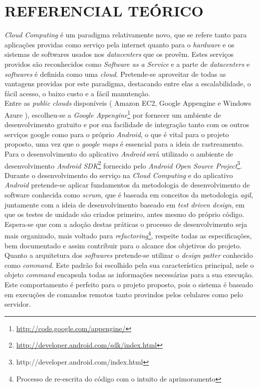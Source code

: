 \chapter{REFERENCIAL TEÓRICO}
\emph{Cloud Computing} é um paradigma relativamente novo, que se refere tanto para aplicações
providas como serviço pela internet quanto para o \emph{hardware} e os sistemas de softwares usados
nos \emph{datacenters} que os provêm. Estes serviços providos são reconhecidos como \emph{Software
as a Service} e a parte de \emph{datacenters} e \emph{softwares} é definida como uma  
\emph{cloud}\cite{clouds}. Pretende-se aproveitar de todas  as vantagens providas por este paradigma, destacando entre elas a
escalabilidade, o  fácil acesso, o baixo custo e a fácil manutenção.\\

Entre as \emph{public clouds} disponíveis ( Amazon EC2, Google Appengine e Windows Azure ),
escolheu-se a \emph{Google Appengine}\footnote{\url{http://code.google.com/appengine/}} por fornecer um ambiente de desenvolvimento gratuito e por sua
facilidade de integração tanto com os outros serviços google como para o próprio \emph{Android}, o
que é vital para o projeto proposto, uma vez que o \emph{google maps} é essencial para a ideia de
rastreamento.\\

Para o desenvolvimento do aplicativo \emph{Android} será utilizado o ambiente de desenvolvimento
\emph{Android SDK}\footnote{\url{http://developer.android.com/sdk/index.html}} fornecido pelo
\emph{Android Open Source Project}\footnote{{http://developer.android.com/index.html}}. \\

Durante o desenvolvimento do serviço na \emph{Cloud Computing} e do aplicativo \emph{Android}
pretende-se aplicar fundamentos da metodologia de desenvolvimento de software conhecida como
\emph{scrum}, que é baseada em conceitos da metodologia \emph{agil}, juntamente com a ideia de desenvolvimento baseado em \emph{test driven design},
em que os testes de unidade são criados primeiro, antes mesmo do próprio código. Espera-se que com a adoção destas práticas o
processo de desenvolvimento seja mais organizado, mais voltado para \emph{refactoring}\footnote{Processo de re-escrita do código com o intuito de aprimoramento}, respeite todas as especificações, bem documentado e assim contribuir para o alcance dos objetivos do projeto. \\

Quanto a arquitetura dos \emph{softwares} pretende-se utilizar o \emph{design patter} conhecido como \emph{command}. Este padrão foi escolhido pela sua característica principal, nele o objeto \emph{command} encapsula todas as informações necessárias para a sua execução. Este comportamento é perfeito para o projeto proposto, pois o sistema é baseado em execuções de comandos remotos tanto provindos pelos celulares como pelo servidor. 
